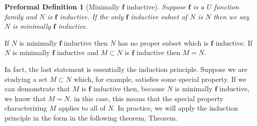 \documentclass[oneside, 12pt]{book}
\theoremstyle{break}
\newtheorem{preformal definition}[definition]{Preformal Definition}
\newtheorem{preformal theorem}[theorem]{Preformal Theorem}
\newcommand{\bv}[1]{\boldsymbol{#1}}
\begin{document}
				\begin{preformal definition}[Minimally $\bv{f}$ inductive]
					Suppose $\bv{f}$ is a $U$ function family and $N$ is $\bv{f}$ inductive.
					If the only $\bv{f}$ inductive subset of $N$ is $N$ then we say $N$ is minimally $\bv{f}$ inductive.
				\end{preformal definition}
				If $N$ is minimally $\bv{f}$ inductive then $N$ has no proper subset which is $\bv{f}$ inductive.
				If $N$ is minimally $\bv{f}$ inductive and $M \subset N$ is $\bv{f}$ inductive then $M = N$.
				
				In fact, the last statement is essentially the induction principle. 
				Suppose we are studying a set $M\subset N$ which, for example, satisfies some special property. If we can demonstrate that $M$ is $\bv{f}$ inductive then, because $N$ is minimally $\bv{f}$ inductive, we know that $M=N$.
				in this case, this means that the special property characterizing $M$ applies to all of $N$.
				In practice, we will apply the induction principle in the form in the following theorem, Theorem.
				
\end{document}
